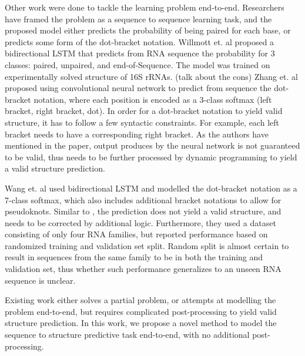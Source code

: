 \documentclass{article}
\begin{document}
Other work were done to tackle the learning problem end-to-end.
Researchers have framed the problem as a sequence to sequence learning task,
and the proposed model either predicts the probability of being paired for each base,
or predicts some form of the dot-bracket notation.
Willmott et. al\cite{willmottstate} proposed a bidirectional LSTM that predicts
from RNA sequence the probability for 3 classes: paired, unpaired, and end-of-Sequence.
The model was trained on experimentally solved structure of 16S rRNAs.
(talk about the cons)
Zhang et. al\cite{zhang2019new} proposed using convolutional neural network to predict from sequence
the dot-bracket notation, where each position is encoded as a 3-class softmax (left bracket, right bracket, dot).
In order for a dot-bracket notation to yield valid structure, it has to follow a few syntactic constraints.
For example, each left bracket needs to have a corresponding right bracket.
As the authors have mentioned in the paper, output produces by the neural network
is not guaranteed to be valid, thus needs to be further processed by dynamic programming
to yield a valid structure prediction.

Wang et. al\cite{wang2019dmfold} used bidirectional LSTM and modelled the dot-bracket notation as a
7-class softmax, which also includes additional bracket notations to allow for pseudoknots.
Similar to \cite{zhang2019new}, the prediction does not yield a valid structure, and needs to be corrected by additional logic.
Furthermore, they used a dataset consisting of only four RNA families,
but reported performance based on randomized training and validation set split.
Random split is almost certain to result in sequences from the same family to be in both the training and validation set,
thus whether such performance generalizes to an unseen RNA sequence is unclear.



Existing work either solves a partial problem, or attempts at modelling the problem end-to-end,
but requires complicated post-processing to yield valid structure prediction.
In this work, we propose a novel method to model the sequence to structure predictive task end-to-end, with
no additional post-processing.




\end{document}
